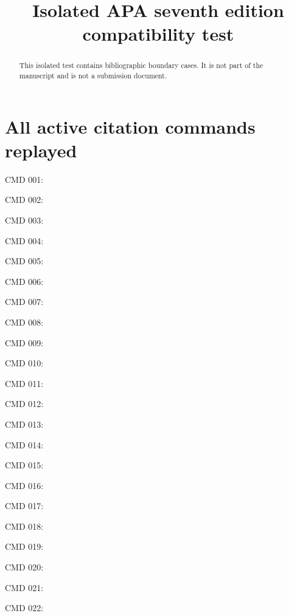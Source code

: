\documentclass[a4paper,fleqn]{cas-dc}
\newcommand{\restoretestcolumns}{%
  \normalfont\setlength{\columnsep}{18pt}%
  \setlength{\columnwidth}{\dimexpr(\textwidth-\columnsep)/2\relax}%
  \setlength{\hsize}{\columnwidth}\setlength{\linewidth}{\columnwidth}}
\begin{document}
\let\WriteBookmarks\relax
\renewcommand{\printorcid}{}
\title{Isolated APA seventh edition compatibility test}
\begin{abstract}This isolated test contains bibliographic boundary cases.
It is not part of the manuscript and is not a submission document.\end{abstract}
\maketitle\restoretestcolumns
\setlength{\emergencystretch}{1em}
\section{All active citation commands replayed}
CMD 001: \citep{brown2020gpt3}\par
CMD 002: \citep{openai2023gpt4}\par
CMD 003: \citep{minsky1988society}\par
CMD 004: \citep{wooldridge1995intelligent}\par
CMD 005: \citep{wu2024autogen}\par
CMD 006: \citep{hong2024metagpt}\par
CMD 007: \citep{du2024multiagent_debate}\par
CMD 008: \citep{guo2024llm_multiagent_survey,tran2025multiagent_survey,wang2024survey_autonomous_agents}\par
CMD 009: \citep{chen2024reconcile}\par
CMD 010: \citep{zhang2024chain_agents}\par
CMD 011: \citep{jiang2026cocoa}\par
CMD 012: \citep{karpukhin2020dpr}\par
CMD 013: \citep{lewis2020rag}\par
CMD 014: \citep{yang2018hotpotqa}\par
CMD 015: \citep{kwiatkowski2019natural_questions}\par
CMD 016: \citep{reddy2019coqa}\par
CMD 017: \citep{choi2018quac}\par
CMD 018: \citep{yao2023react}\par
CMD 019: \citep{vaswani2017attention}\par
CMD 020: \citep{devlin2019bert}\par
CMD 021: \citep{brown2020gpt3}\par
CMD 022: \citep{openai2023gpt4}\par
\end{document}

